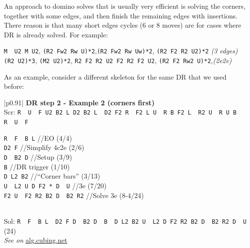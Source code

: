 \documentclass[11pt,a4paper]{book}
\newcommand{\p}{\textquotesingle}
\newcommand{\m}{\texttt}
\newcommand{\ps}{\p\,\,}
\newcommand{\comment}[1]{{\color{gray}\quad//#1}}
\begin{document}
An approach to domino solves that is usually very efficient is solving the corners, together with some edges, and then finish the remaining edges with insertions. There reason is that many short edges cycles ($6$ or $8$ moves) are for cases where DR is already solved. For example:
\begin{center}
\m{M\ps U2 M U2}, \quad\m{(R2 Fw2 Rw U)*2},\quad\m{(R2 Fw2 Rw Uw)*2}, \quad \m{(R2 F2 R2 U2)*2} \qquad \emph{(3 edges)}\\
\m{(R2 U2)*3}, \quad \m{(M2 U2)*2}, \quad \m{R2 F2 R2 U2 F2 R2 F2 U2}, \quad \m{(R2 F2 Rw2 U)*2},\qquad \emph{(2e2e)}
\end{center}

As an example, consider a different skeleton for the same DR that we used before:

\bigskip
\begin{tabular}{|p{}|}
\hline
\textbf{DR step 2 - Example 2 (corners first)}\\
\hline
Scr: \m{R\ps U\ps F  U2 B2 L  D2 B2 L\ps D2 F2 R\ps F2 L  U\ps R B  F2 L\ps R2 U\ps R  U  B R\ps U\ps F}\\
\hline
\begin{minipage}[l]{0.650\textwidth}
\m{R\ps F\ps B L\p} \comment{EO (4/4)}\\
\m{D2 F} \comment{Simplify 4c2e (2/6)}\\
\m{D\ps B2 D\p} \comment{Setup (3/9)}\\
\m{B\p} \comment{DR trigger (1/10)}\\
\m{D L2 B2} \comment{``Corner bars'' (3/13)}\\
\m{U\ps L2 U D F2 * D\ps U} \comment{3e (7/20)}\\
\m{F2 U\ps F2 R2 B2 D\ps B2 R2} \comment{Solve 3e (8-4/24)}
\end{minipage}
\begin{minipage}[c]{0.25\textwidth}

\end{minipage}\\
\hline
Sol: \m{R\ps F\ps B L\ps D2 F D\ps B2 D\ps B\ps D L2 B2 U\ps L2 D F2 R2 B2 D\ps B2 R2 D\ps U} (24)\\
\hline
\emph{See on }\href{https://alg.cubing.net/?alg=R-_F-_B_L-_\%2F\%2FEO_(4\%2F4)\%0AD2_F_\%2F\%2FSimplify_(2\%2F6)\%0AD-_B2_D-_B-_\%2F\%2FDR_(4\%2F10)\%0AD_L2_B2_\%2F\%2FCorner_bars_(3\%2F13)\%0AU-_L2_U_D_F2_D-_U_\%2F\%2F3e_(7\%2F20)&setup=R-_U-_F__U2_B2_L__D2_B2_L-_D2_F2_R-_F2_L__U-_R__B__F2_L-_R2_U-_R__U__B__R-_U-_F}{alg.cubing.net}\\
\hline
\end{tabular}
\bigskip
\end{document}
